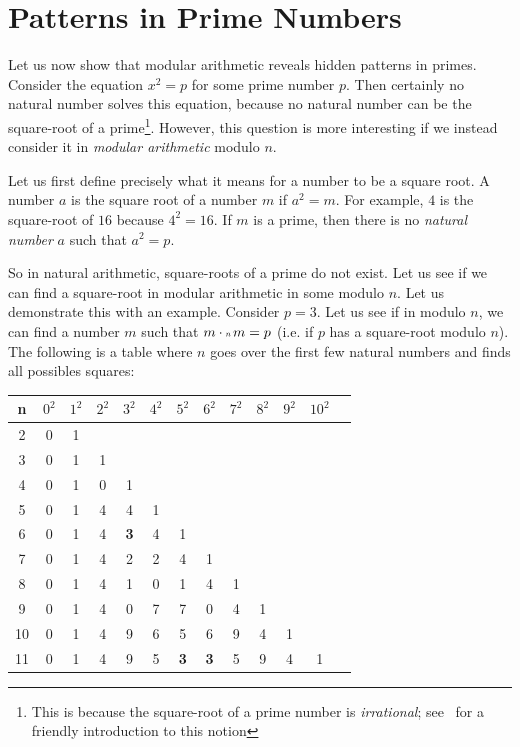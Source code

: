 \documentclass{article}
\newcommand\scalemath[2]{\scalebox{#1}{\mbox{\ensuremath{\displaystyle #2}}}}
\newcommand{\Cdot}[1]{\cdot{\scalemath{0.6}{#1}}\,}
\begin{document}
\section{Patterns in Prime Numbers}

Let us now show that modular arithmetic reveals hidden patterns in primes. Consider the equation $x^2 = p$ for some prime number $p$. Then certainly no natural number solves this
equation, because no natural number can be the square-root of a prime\footnote{This is because the square-root
  of a prime number is \emph{irrational}; see~\cite{fuchsIntroductionProofsProof} for a friendly introduction
to this notion}. However, this question is more interesting if we instead consider it in \emph{modular
arithmetic} modulo $n$.

Let us first define precisely what it means for a number to be a square root. A number $a$ is the
square root of a number $m$  if $a^2 = m$. For example, $4$ is the square-root of $16$
because $4^2 = 16$. If $m$ is a prime, then there is no \emph{natural number} $a$ such that $a^2
= p$.

So in natural arithmetic, square-roots of a prime do not exist. Let us see if we can find
a square-root in modular arithmetic in some modulo $n$. Let us demonstrate this with an
example. Consider $p = 3$. Let us see if in modulo $n$, we can find a number $m$ such that
$m\Cdot{n} m = p$ (i.e. if $p$ has a square-root modulo $n$). The following is a table
where $n$ goes over the first few natural numbers and finds all possibles squares:

\begin{center}
  \begin{tabular}{|c||c|c|c|c|c|c|c|c|c|c|c|c|}
\hline
n & $0^2$ & $1^2$ & $2^2$ & $3^2$ & $4^2$ & $5^2$ & $6^2$ & $7^2$ & $8^2$ & $9^2$ & $10^2$\\
\hline
2 & 0 & 1 & & & & & & & & & \\
\hline
3 & 0 & 1 & 1 & & & & & & & & \\
\hline
4 & 0 & 1 & 0 & 1 & & & & & & & \\
\hline
5 & 0 & 1 & 4 & 4 & 1 & & & & & & \\
\hline
6 & 0 & 1 & 4 & \cellcolor{green!20}\textbf{3} & 4 & 1 & & & & & \\
\hline
7 & 0 & 1 & 4 & 2 & 2 & 4 & 1 & & & & \\
\hline
8 & 0 & 1 & 4 & 1 & 0 & 1 & 4 & 1 & & & \\
\hline
9 & 0 & 1 & 4 & 0 & 7 & 7 & 0 & 4 & 1 & & \\
\hline
10 & 0 & 1 & 4 & 9 & 6 & 5 & 6 & 9 & 4 & 1 & \\
\hline
11 & 0 & 1 & 4 & 9 & 5 & \cellcolor{green!20}\textbf{3} & \cellcolor{green!20}\textbf{3} & 5 & 9 & 4 & 1 \\
\hline
\end{tabular}
\end{center}
\end{document}
